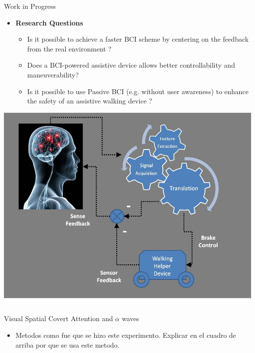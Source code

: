 \documentclass[final]{beamer}
\begin{document}
\begin{frame}
            \begin{block}{Work in Progress}
              \begin{itemize}
              \item \textbf{Research Questions}
                \begin{itemize}
                \item Is it possible to achieve a faster BCI scheme by centering on the feedback from the real environment ?
                \item Does a BCI-powered assistive device allows better controllability and maneuverability?
                \item Is it possible to use Passive BCI (e.g. without user awareness) to enhance the safety of an assistive walking device ?
                \end{itemize}
              \end{itemize}  
		\centering
                \includegraphics[width=0.4\linewidth]{images/viola/bcidesign}
            \end{block}
  
  
  
  
  \begin{columns}
    \begin{column}{.49\textwidth}
            \vfill
            \begin{block}{Visual Spatial Covert Attention and $ \alpha$  waves}
              \begin{itemize}
              \item Metodos como fue que se hizo este experimento.  Explicar en el cuadro de arriba por que se usa este metodo.
              

\end{itemize}
\end{block}
\end{column}
\end{columns}
\end{frame}
\end{document}
